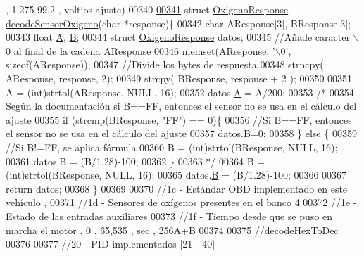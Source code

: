 \begin{DoxyCode}
{{{{       , 1.275 99.2 , voltios %
       ajuste)  }
00340 
\hyperlink{decoders_8hpp_a5b53fc5fc37fbee9c5e389f6c8c18438}{00341} \textcolor{keyword}{struct }\hyperlink{structOxigenoResponse}{OxigenoResponse} \hyperlink{decoders_8cpp_a5b53fc5fc37fbee9c5e389f6c8c18438}{decodeSensorOxigeno}(char *response)\{
00342     \textcolor{keywordtype}{char} AResponse[3], BResponse[3];
00343     \textcolor{keywordtype}{float} \hyperlink{structOxigenoResponse_a068c403e5746226cf22bb020b4c786d3}{A}, \hyperlink{structOxigenoResponse_a96b19152dd001e19d1351e2d97f22736}{B};
00344     \textcolor{keyword}{struct }\hyperlink{structOxigenoResponse}{OxigenoResponse} datos; 
00345     \textcolor{comment}{//Añade caracter \(\backslash\)0 al final de la cadena AResponse}
00346     memset(AResponse, \textcolor{charliteral}{'\(\backslash\)0'}, \textcolor{keyword}{sizeof}(AResponse));
00347     \textcolor{comment}{//Divide los bytes de respuesta}
00348     strncpy( AResponse, response, 2);
00349     strcpy( BResponse, response + 2 );
00350 
00351     A = (int)strtol(AResponse, NULL, 16);
00352     datos.\hyperlink{structOxigenoResponse_a068c403e5746226cf22bb020b4c786d3}{A} = A/200;
00353     \textcolor{comment}{/*}
00354 \textcolor{comment}{    Según la documentación si B==FF, entonces el sensor no se usa en el cálculo del ajuste}
00355 \textcolor{comment}{    if (strcmp(BResponse, "FF") == 0)\{}
00356 \textcolor{comment}{        //Si B==FF, entonces el sensor no se usa en el cálculo del ajuste}
00357 \textcolor{comment}{        datos.B=0;}
00358 \textcolor{comment}{    \} else \{}
00359 \textcolor{comment}{        //Si B!=FF, se aplica fórmula}
00360 \textcolor{comment}{        B = (int)strtol(BResponse, NULL, 16);}
00361 \textcolor{comment}{        datos.B = (B/1.28)-100;}
00362 \textcolor{comment}{    \} }
00363 \textcolor{comment}{    */}
00364     B = (int)strtol(BResponse, NULL, 16);
00365     datos.\hyperlink{structOxigenoResponse_a96b19152dd001e19d1351e2d97f22736}{B} = (B/1.28)-100;
00366     
00367     \textcolor{keywordflow}{return} datos;
00368 \}
00369 
00370 \textcolor{comment}{//1c - Estándar OBD implementado en este vehículo , }
00371 \textcolor{comment}{//1d - Sensores de oxígenos presentes en el banco 4}
00372 \textcolor{comment}{//1e - Estado de las entradas auxiliares }
00373 \textcolor{comment}{//1f - Tiempo desde que se puso en marcha el motor , 0 , 65,535 , sec , 256A+B }
00374 
00375 \textcolor{comment}{//decodeHexToDec}
00376 
00377 \textcolor{comment}{//20 - PID implementados [21 - 40] }
}}}
\end{DoxyCode}
